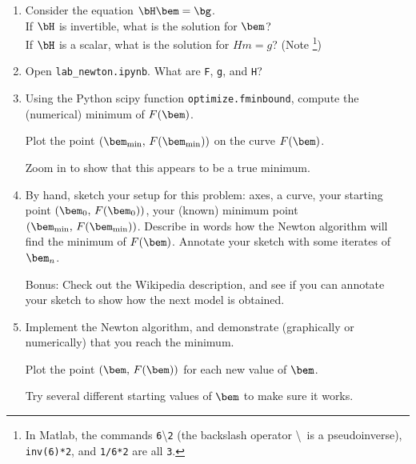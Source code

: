 \documentclass[11pt,titlepage,fleqn]{article}
\renewcommand{\vertgap}{\vspace{1.5cm}}
\begin{document}
\begin{enumerate}
\item Consider the equation $\bH\bem = \bg$. \\
If $\bH$ is invertible, what is the solution for $\bem$? \\
If $\bH$ is a scalar, what is the solution for $Hm = g$? (Note \footnote{In Matlab, the commands \texttt{6}\textbackslash\texttt{2} (the backslash operator \textbackslash\ is a pseudoinverse), \texttt{inv(6)*2}, and \texttt{1/6*2} are all \texttt{3}.})


\vertgap

\item Open \verb+lab_newton.ipynb+. What are \verb+F+, \verb+g+, and \verb+H+?

\vertgap

\item Using the Python scipy function \verb+optimize.fminbound+, compute the (numerical) minimum of $F(\bem)$.

Plot the point $(\bem_{\rm min},\,F(\bem_{\rm min}))$ on the curve $F(\bem)$.

Zoom in to show that this appears to be a true minimum.

\item By hand, sketch your setup for this problem: axes, a curve, your starting point $(\bem_0,\,F(\bem_0))$, your (known) minimum point $(\bem_{\rm min},\,F(\bem_{\rm min}))$. Describe in words how the Newton algorithm will find the minimum of $F(\bem)$. Annotate your sketch with some iterates of $\bem_n$.

Bonus: Check out the Wikipedia description, and see if you can annotate your sketch to show how the next model is obtained.

\vspace{10cm}

\item Implement the Newton algorithm, and demonstrate (graphically or numerically) that you reach the minimum.

Plot the point $(\bem,\,F(\bem))$ for each new value of $\bem$.

Try several different starting values of $\bem$ to make sure it works.

\vertgap


\end{enumerate}
\end{document}
